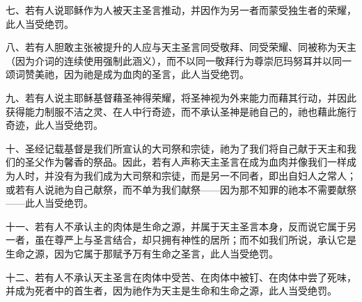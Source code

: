 七、若有人说耶稣作为人被天主圣言推动，并因作为另一者而蒙受独生者的荣耀，此人当受绝罚。\par

八、若有人胆敢主张被提升的人应与天主圣言同受敬拜、同受荣耀、同被称为天主（因为介词的连续使用强制此涵义），而不以同一敬拜行为尊崇厄玛努耳并以同一颂词赞美祂，因为祂是成为血肉的圣言，此人当受绝罚。\par

九、若有人说主耶稣基督藉圣神得荣耀，将圣神视为外来能力而藉其行动，并因此获得能力制服不洁之灵、在人中行奇迹，而不承认圣神是祂自己的，祂也藉此施行奇迹，此人当受绝罚。\par

十、圣经记载基督是我们所宣认的大司祭和宗徒，祂为了我们将自己献于天主和我们的圣父作为馨香的祭品。因此，若有人声称天主圣言在成为血肉并像我们一样成为人时，并没有为我们成为大司祭和宗徒，而是另一不同者，即出自妇人之常人；或若有人说祂为自己献祭，而不单为我们献祭——因为那不知罪的祂本不需要献祭——此人当受绝罚。\par

十一、若有人不承认主的肉体是生命之源，并属于天主圣言本身，反而说它属于另一者，虽在尊严上与圣言结合，却只拥有神性的居所；而不如我们所说，承认它是生命之源，因为它属于那赋予万有生命之圣言，此人当受绝罚。\par

十二、若有人不承认天主圣言在肉体中受苦、在肉体中被钉、在肉体中尝了死味，并成为死者中的首生者，因为祂作为天主是生命和生命之源，此人当受绝罚。\par

